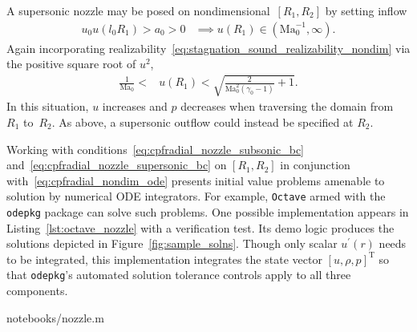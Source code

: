 \documentclass[letterpaper,11pt,nointlimits,reqno]{amsart}
\newcommand{\Mach}[1][]{\mbox{Ma}_{#1}}
\begin{document}
A supersonic nozzle may be posed on nondimensional~$\left[R_{1}, R_{2}\right]$
by setting inflow
\begin{align}
   u_0 u\!\left(l_0 R_{1}\right) > a_0 > 0
   &\implies
   u\!\left(R_{1}\right) \in \left(\Mach[0]^{-1}, \infty\right)
.
\end{align}
Again incorporating
realizability~\eqref{eq:stagnation_sound_realizability_nondim} via the positive
square root of $u^2$,
\begin{align}
  \frac{1}{\Mach[0]} < &u\!\left(R_1\right)
  < \sqrt{\frac{2}{\Mach[0]^2\left(\gamma_0-1\right)}+1}
\label{eq:cpfradial_nozzle_supersonic_bc}
.
\end{align}
In this situation, $u$ increases and $p$ decreases when traversing the domain
from~$R_{1}$ to~$R_{2}$.  As above, a supersonic outflow could instead be
specified at $R_{2}$.

Working with conditions~\eqref{eq:cpfradial_nozzle_subsonic_bc}
and~\eqref{eq:cpfradial_nozzle_supersonic_bc} on $\left[R_1, R_2\right]$ in
conjunction with~\eqref{eq:cpfradial_nondim_ode} presents initial value
problems amenable to solution by numerical ODE integrators.  For example,
\texttt{Octave}\citep{Eaton2008GNU} armed with the \texttt{odepkg} package can
solve such problems.  One possible implementation appears in
Listing~\ref{lst:octave_nozzle} with a verification test.  Its demo logic
produces the solutions depicted in Figure~\ref{fig:sample_solns}.  Though only
scalar $u^\prime\!\left(r\right)$ needs to be integrated, this implementation
integrates the state vector $\left[u, \rho, p\right]^\mathrm{T}$ so that
\texttt{odepkg}'s automated solution tolerance controls apply to all three
components.


                {notebooks/nozzle.m}
\end{document}
